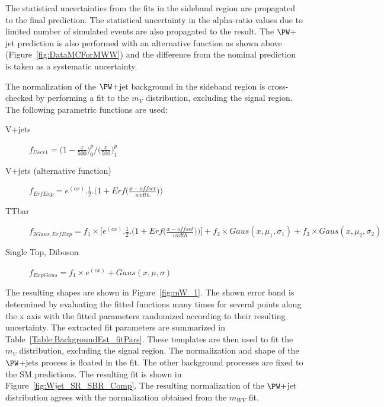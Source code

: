 The statistical uncertainties from the fits in the sideband region are propagated to the final prediction. The statistical uncertainty in the alpha-ratio values due to limited number of simulated events are also propagated to the result. The $\PW+$jet prediction is also performed with an alternative function as shown above (Figure~\ref{fig:DataMCForMWW}) and the difference from the nominal prediction is taken as a systematic uncertainty.    

The normalization of the $\PW+$jet background in the sideband region is cross-checked by performing a fit to the $m_{V}$ distribution, excluding the signal region. The following parametric functions are used: 

\begin{description}
	\item [V+jets] $f_{User1} = \Big(1-\frac{x}{500}\Big)^p_0/\Big(\frac{x}{500}\Big)^p_1$ 
	\item [V+jets (alternative function)] $f_{ErfExp} = e^{(cx)}. \frac{1}{2}.\Big(1+Erf\big(\frac{x-offset}{width}\big)\Big)$
	\item [TTbar] $f_{2Gaus\_ErfExp} = f_1 \times \Big[e^{(cx)}. \frac{1}{2}.\Big(1+Erf\big(\frac{x-offset}{width}\big)\Big)\Big] + f_2 \times Gaus(x,\mu_1,\sigma_1) + f_3\times Gaus(x,\mu_2,\sigma_2) $
	\item [Single Top, Diboson] $f_{ExpGaus} = f_1 \times e^{(cx)} + Gaus(x,\mu,\sigma) $
\end{description}

The resulting shapes are shown in Figure~\ref{fig:mW_1}. The shown error band is determined by evaluating the fitted functions many times for several points along the x axis with the fitted parameters randomized according to their resulting uncertainty. The extracted fit parameters are summarized in Table~\ref{Table:BackgroundEst_fitPars}. These templates are then used to fit the $m_{V}$ distribution, excluding the signal region. The normalization and shape of the  $\PW$+jets process is floated in the fit. The other background processes are fixed to the SM predictions. The resulting fit is shown in Figure~\ref{fig:Wjet_SR_SBR_Comp}. The resulting normalization of the $\PW+$jet distribution agrees with the normalization obtained from the $m_{WV}$ fit.

